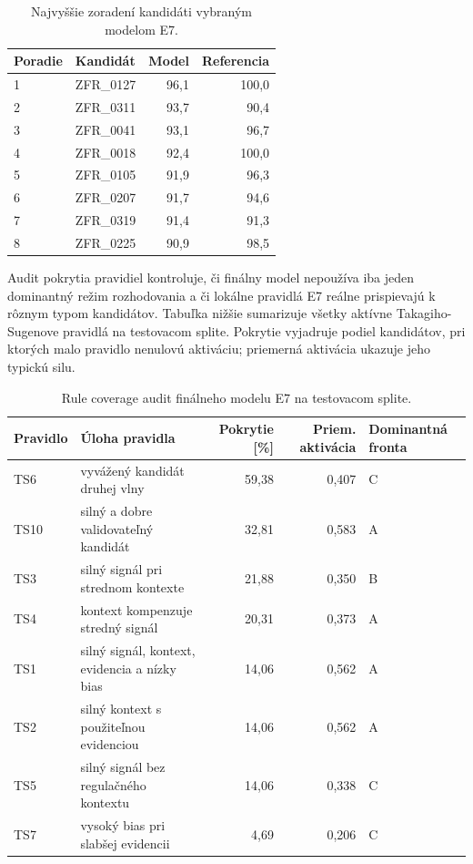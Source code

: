 \documentclass[12pt,a4paper]{article}
\begin{document}
\begin{table}[htbp]
\centering
\caption{Najvyššie zoradení kandidáti vybraným modelom E7.}
\small
\begin{tabular}{llrr}
\toprule
Poradie & Kandidát & Model & Referencia \\
\midrule
1 & ZFR\_0127 & 96,1 & 100,0 \\
2 & ZFR\_0311 & 93,7 & 90,4 \\
3 & ZFR\_0041 & 93,1 & 96,7 \\
4 & ZFR\_0018 & 92,4 & 100,0 \\
5 & ZFR\_0105 & 91,9 & 96,3 \\
6 & ZFR\_0207 & 91,7 & 94,6 \\
7 & ZFR\_0319 & 91,4 & 91,3 \\
8 & ZFR\_0225 & 90,9 & 98,5 \\
\bottomrule
\end{tabular}
\end{table}

Audit pokrytia pravidiel kontroluje, či finálny model nepoužíva iba jeden dominantný režim rozhodovania a či lokálne pravidlá E7 reálne prispievajú k rôznym typom kandidátov. Tabuľka nižšie sumarizuje všetky aktívne Takagiho-Sugenove pravidlá na testovacom splite. Pokrytie vyjadruje podiel kandidátov, pri ktorých malo pravidlo nenulovú aktiváciu; priemerná aktivácia ukazuje jeho typickú silu.

\begin{table}[htbp]
\centering
\caption{Rule coverage audit finálneho modelu E7 na testovacom splite.}
\footnotesize
\setlength{\tabcolsep}{4pt}
\begin{tabular}{l>{\raggedright\arraybackslash}p{4.4cm}rr>{\raggedright\arraybackslash}p{3.4cm}}
\toprule
Pravidlo & Úloha pravidla & Pokrytie [\%] & Priem. aktivácia & Dominantná fronta \\
\midrule
TS6 & vyvážený kandidát druhej vlny & 59,38 & 0,407 & C \\
TS10 & silný a dobre validovateľný kandidát & 32,81 & 0,583 & A \\
TS3 & silný signál pri strednom kontexte & 21,88 & 0,350 & B \\
TS4 & kontext kompenzuje stredný signál & 20,31 & 0,373 & A \\
TS1 & silný signál, kontext, evidencia a nízky bias & 14,06 & 0,562 & A \\
TS2 & silný kontext s použiteľnou evidenciou & 14,06 & 0,562 & A \\
TS5 & silný signál bez regulačného kontextu & 14,06 & 0,338 & C \\
TS7 & vysoký bias pri slabšej evidencii & 4,69 & 0,206 & C \\
\bottomrule
\end{tabular}
\end{table}
\end{document}

